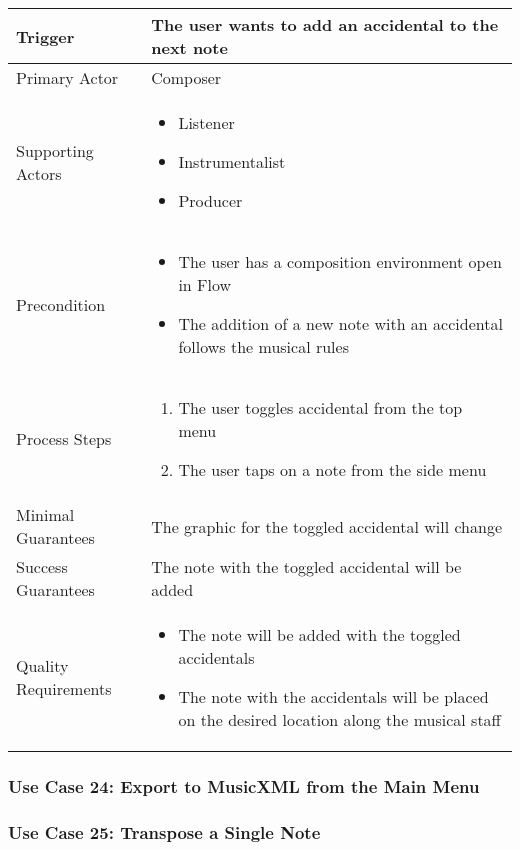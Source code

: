 \begin{tabularx}{\textwidth}{|X|X|}
\hline
Trigger & 
The user wants to add an accidental to the next note \\
\hline
Primary Actor & 
Composer \\
\hline
Supporting Actors & 
\begin{itemize}
\item Listener
\item Instrumentalist
\item Producer
\end{itemize} \\
\hline
Precondition & 
\begin{itemize}
\item The user has a composition environment open in Flow
\item The addition of a new note with an accidental follows the musical rules
\end{itemize} \\
\hline
Process Steps & 
\begin{enumerate}
\item The user toggles accidental from the top menu
\item The user taps on a note from the side menu
\end{enumerate} \\
\hline
Minimal Guarantees & 
The graphic for the toggled accidental will change \\
\hline
Success Guarantees & 
The note with the toggled accidental will be added \\
\hline
Quality Requirements & 
\begin{itemize}
\item The note will be added with the toggled accidentals
\item The note with the accidentals will be placed on the desired location along the musical staff
\end{itemize} \\ 
\hline
\end{tabularx}

\subsubsection{Use Case 24: Export to MusicXML from the Main Menu}


\subsubsection{Use Case 25: Transpose a Single Note}

